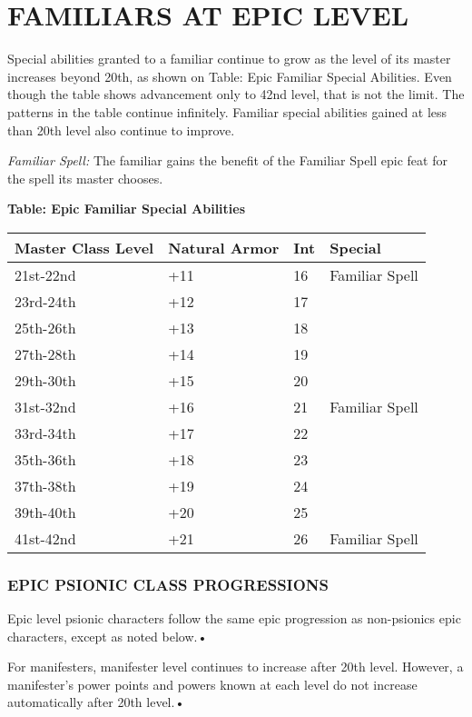 \documentclass{article}
\begin{document}
\vspace{24pt}
\section*{FAMILIARS AT EPIC LEVEL }

Special abilities granted to a familiar continue to grow as the level of its master 
increases beyond 20th, as shown on Table: Epic Familiar Special Abilities. Even 
though the table shows advancement only to 42nd level, that is not the limit. The 
patterns in the table continue infinitely. Familiar special abilities gained at 
less than 20th level also continue to improve. 

\textit{Familiar Spell: }The familiar gains the benefit of the Familiar Spell epic 
feat for the spell its master chooses. 

\textbf{Table: Epic Familiar Special Abilities}

\begin{tabular}{|>{\raggedright}p{65pt}|>{\raggedright}p{42pt}|>{\raggedright}p{24pt}|>{\raggedright}p{78pt}|}
\hline
M\textbf{aster Class Level} & N\textbf{atural Armor} & I\textbf{nt} & S\textbf{pecial 
}\tabularnewline
\hline
21st-22nd & +11 & 16 & Familiar Spell \tabularnewline
\hline
23rd-24th & +12 & 17  & \tabularnewline
\hline
25th-26th & +13 & 18 & \tabularnewline
\hline
27th-28th & +14 & 19  & \tabularnewline
\hline
29th-30th & +15 & 20  & \tabularnewline
\hline
31st-32nd & +16 & 21 & Familiar Spell \tabularnewline
\hline
33rd-34th & +17 & 22  & \tabularnewline
\hline
35th-36th & +18 & 23  & \tabularnewline
\hline
37th-38th & +19 & 24  & \tabularnewline
\hline
39th-40th & +20 & 25  & \tabularnewline
\hline
41st-42nd & +21 & 26 & Familiar Spell \tabularnewline
\hline
\end{tabular}

\vspace{36pt}
\subsubsection*{{\LARGE{}EPIC PSIONIC CLASS PROGRESSIONS}}

Epic level psionic characters follow the same epic progression as non-psionics 
epic characters, except as noted below.• 

\parindent=3pt
For manifesters, manifester level continues to increase after 20th level. However, 
a manifester's power points and powers known at each level do not increase automatically 
after 20th level.• 
\end{document}
